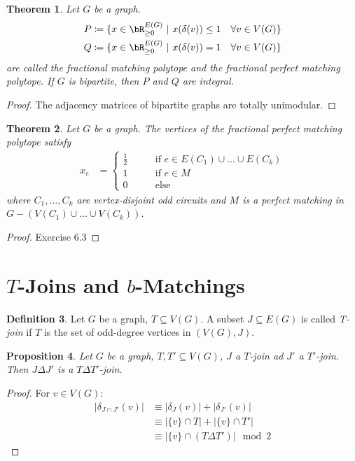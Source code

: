 \documentclass[11pt, a4paper]{article}
\newcommand{\abs}[1]{\left\lvert#1\right\rvert}
\newcommand{\set}[1]{\{#1\}}
\newtheorem{theorem}{Theorem}[section]
\newtheorem{prop}[theorem]{Proposition}
\theoremstyle{remark}
\theoremstyle{definition}
\newtheorem{definition}[theorem]{Definition}
\begin{document}

\begin{theorem}
	Let $G$ be a graph.
	\begin{align*}
		P & \coloneqq \set{x\in\bR_{\geq0}^{E(G)}\ |\ x(\delta(v))\leq 1 \quad\forall v\in V(G)} \\
		Q & \coloneqq\set{x\in\bR_{\geq0}^{E(G)}\ |\ x(\delta(v))=1 \quad\forall v\in V(G)}
	\end{align*}
	are called the \emph{fractional matching polytope} and the \emph{fractional
		perfect matching polytope}.
	If $G$ is bipartite, then $P$ and $Q$ are integral.
\end{theorem}
\begin{proof}
	The adjacency matrices of bipartite graphs are totally unimodular.
\end{proof}

\begin{theorem}
	Let $G$ be a graph. The vertices of the fractional perfect matching
	polytope satisfy
	\begin{align*}
		x_e & =\begin{cases}
			       \frac{1}{2} \qquad & \text{if }e\in E(C_1)\cup\ldots\cup E(C_k) \\
			       1 \qquad           & \text{if }e\in M                           \\
			       0 \qquad           & \text{else}
		       \end{cases}
	\end{align*}
	where $C_1,\ldots,C_k$ are vertex-disjoint odd circuits and $M$ is a perfect
	matching in $G-\left(V(C_1)\cup\ldots\cup V(C_k)\right)$.
\end{theorem}
\begin{proof}
	Exercise 6.3
\end{proof}

\section{\texorpdfstring{$T$}{T}-Joins and \texorpdfstring{$b$}{b}-Matchings}
\begin{definition}
	Let $G$ be a graph, $T\subseteq V(G)$. A subset $J\subseteq E(G)$ is called
	\emph{T-join} if $T$ is the set of odd-degree vertices in $(V(G),J)$.
\end{definition}

\begin{prop}\label{prop:t-join-symm-diff}
	Let $G$ be a graph, $T,T'\subseteq V(G)$, $J$ a $T$-join ad $J'$ a $T'$-join.
	Then $J\Delta J'$ is a $T\Delta T'$-join.
\end{prop}
\begin{proof}
	For $v\in V(G)$:
	\begin{align*}
		\abs{\delta_{J\cap J'}(v)} & \equiv \abs{\delta_J(v)}+\abs{\delta_{J'}(v)}   \\
		                           & \equiv \abs{\set{v}\cap T}+\abs{\set{v}\cap T'} \\
		                           & \equiv \abs{\set{v}\cap (T\Delta T')} \mod 2
	\end{align*}
\end{proof}
\end{document}
